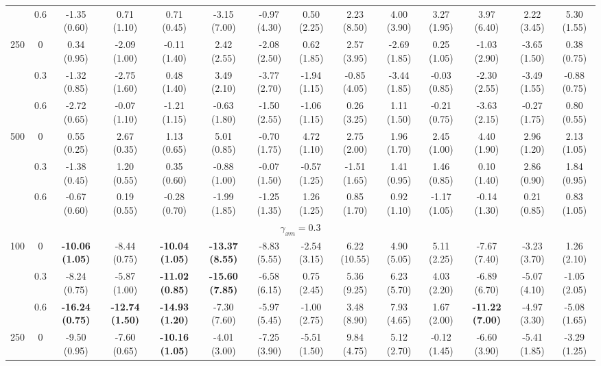 \documentclass[
  man]{apa6}
\newenvironment{lltable}{\begin{landscape}\centering\begin{ThreePartTable}}{\end{ThreePartTable}\end{landscape}}
\begin{document}
\begin{lltable}
{\begin{longtable}{cccccccccccccc}
 & 0.6 & -1.35 (0.60) & 0.71 (1.10) & 0.71 (0.45) & -3.15 (7.00) & -0.97 (4.30) & 0.50 (2.25) & 2.23 (8.50) & 4.00 (3.90) & 3.27 (1.95) & 3.97 (6.40) & 2.22 (3.45) & 5.30 (1.55)\\
250 & 0 & 0.34 (0.95) & -2.09 (1.00) & -0.11 (1.40) & 2.42 (2.55) & -2.08 (2.50) & 0.62 (1.85) & 2.57 (3.95) & -2.69 (1.85) & 0.25 (1.05) & -1.03 (2.90) & -3.65 (1.50) & 0.38 (0.75)\\
 & 0.3 & -1.32 (0.85) & -2.75 (1.60) & 0.48 (1.40) & 3.49 (2.10) & -3.77 (2.70) & -1.94 (1.15) & -0.85 (4.05) & -3.44 (1.85) & -0.03 (0.85) & -2.30 (2.55) & -3.49 (1.55) & -0.88 (0.75)\\
 & 0.6 & -2.72 (0.65) & -0.07 (1.10) & -1.21 (1.15) & -0.63 (1.80) & -1.50 (2.55) & -1.06 (1.15) & 0.26 (3.25) & 1.11 (1.50) & -0.21 (0.75) & -3.63 (2.15) & -0.27 (1.75) & 0.80 (0.55)\\
500 & 0 & 0.55 (0.25) & 2.67 (0.35) & 1.13 (0.65) & 5.01 (0.85) & -0.70 (1.75) & 4.72 (1.10) & 2.75 (2.00) & 1.96 (1.70) & 2.45 (1.00) & 4.40 (1.90) & 2.96 (1.20) & 2.13 (1.05)\\
 & 0.3 & -1.38 (0.45) & 1.20 (0.55) & 0.35 (0.60) & -0.88 (1.00) & -0.07 (1.50) & -0.57 (1.25) & -1.51 (1.65) & 1.41 (0.95) & 1.46 (0.85) & 0.10 (1.40) & 2.86 (0.90) & 1.84 (0.95)\\
 & 0.6 & -0.67 (0.60) & 0.19 (0.55) & -0.28 (0.70) & -1.99 (1.85) & -1.25 (1.35) & 1.26 (1.25) & 0.85 (1.70) & 0.92 (1.10) & -1.17 (1.05) & -0.14 (1.30) & 0.21 (0.85) & 0.83 (1.05)\\
\multicolumn{14}{c}{$\gamma_{xm} = 0.3$}\\
100 & 0 & \textbf{-10.06 (1.05)} & -8.44 (0.75) & \textbf{-10.04 (1.05)} & \textbf{-13.37 (8.55)} & -8.83 (5.55) & -2.54 (3.15) & 6.22 (10.55) & 4.90 (5.05) & 5.11 (2.25) & -7.67 (7.40) & -3.23 (3.70) & 1.26 (2.10)\\
 & 0.3 & -8.24 (0.75) & -5.87 (1.00) & \textbf{-11.02 (0.85)} & \textbf{-15.60 (7.85)} & -6.58 (6.15) & 0.75 (2.45) & 5.36 (9.25) & 6.23 (5.70) & 4.03 (2.20) & -6.89 (6.70) & -5.07 (4.10) & -1.05 (2.05)\\
 & 0.6 & \textbf{-16.24 (0.75)} & \textbf{-12.74 (1.50)} & \textbf{-14.93 (1.20)} & -7.30 (7.60) & -5.97 (5.45) & -1.00 (2.75) & 3.48 (8.90) & 7.93 (4.65) & 1.67 (2.00) & \textbf{-11.22 (7.00)} & -4.97 (3.30) & -5.08 (1.65)\\
250 & 0 & -9.50 (0.95) & -7.60 (0.65) & \textbf{-10.16 (1.05)} & -4.01 (3.00) & -7.25 (3.90) & -5.51 (1.50) & 9.84 (4.75) & 5.12 (2.70) & -0.12 (1.45) & -6.60 (3.90) & -5.41 (1.85) & -3.29 (1.25)\\

\end{longtable}}
\end{lltable}
\end{document}
